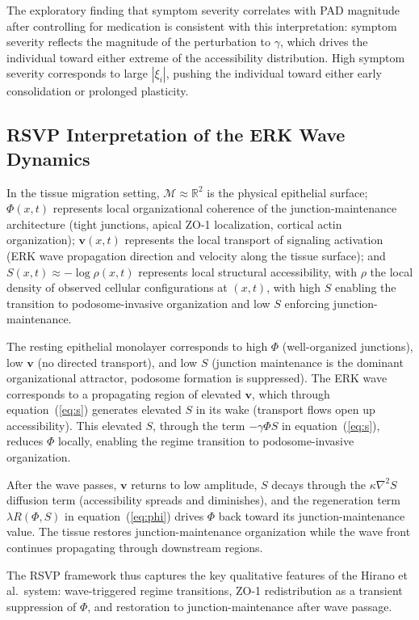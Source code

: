 \documentclass[11pt,a4paper]{article}
\theoremstyle{plain}
\theoremstyle{definition}
\begin{document}
The exploratory finding that symptom severity correlates with PAD magnitude after
controlling for medication is consistent with this interpretation: symptom severity
reflects the magnitude of the perturbation to $\gamma$, which drives the individual
toward either extreme of the accessibility distribution. High symptom severity
corresponds to large $|\xi_i|$, pushing the individual toward either early consolidation
or prolonged plasticity.

\subsection{RSVP Interpretation of the ERK Wave Dynamics}

In the tissue migration setting, $\mathcal{M} \approx \mathbb{R}^2$ is the physical
epithelial surface; $\Phi(x, t)$ represents local organizational coherence of the
junction-maintenance architecture (tight junctions, apical ZO-1 localization, cortical
actin organization); $\mathbf{v}(x, t)$ represents the local transport of signaling
activation (ERK wave propagation direction and velocity along the tissue surface); and
$S(x, t) \approx -\log\rho(x,t)$ represents local structural accessibility, with $\rho$
the local density of observed cellular configurations at $(x,t)$, with high $S$ enabling
the transition to podosome-invasive organization and low $S$ enforcing junction-maintenance.

The resting epithelial monolayer corresponds to high $\Phi$ (well-organized junctions),
low $\mathbf{v}$ (no directed transport), and low $S$ (junction maintenance is the dominant
organizational attractor, podosome formation is suppressed). The ERK wave corresponds to
a propagating region of elevated $\mathbf{v}$, which through equation~(\ref{eq:s})
generates elevated $S$ in its wake (transport flows open up accessibility). This elevated
$S$, through the term $-\gamma \Phi S$ in equation~(\ref{eq:s}), reduces $\Phi$ locally,
enabling the regime transition to podosome-invasive organization.

After the wave passes, $\mathbf{v}$ returns to low amplitude, $S$ decays through the
$\kappa \nabla^2 S$ diffusion term (accessibility spreads and diminishes), and the
regeneration term $\lambda R(\Phi, S)$ in equation~(\ref{eq:phi}) drives $\Phi$ back
toward its junction-maintenance value. The tissue restores junction-maintenance
organization while the wave front continues propagating through downstream regions.

The RSVP framework thus captures the key qualitative features of the Hirano et al.\
system: wave-triggered regime transitions, ZO-1 redistribution as a transient suppression
of $\Phi$, and restoration to junction-maintenance after wave passage.
\end{document}
